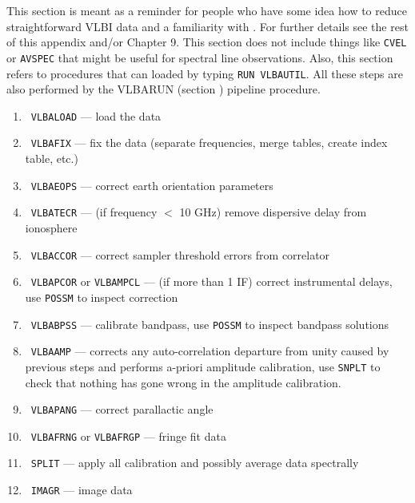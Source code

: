 %

This section is meant as a reminder for people who have some idea how
to reduce straightforward VLBI data and a familiarity with \AIPS\@.
For further details see the rest of this appendix and/or Chapter 9.
This section does not include things like {\tt CVEL} or {\tt AVSPEC}
that might be useful for spectral line observations.  Also, this section
refers to procedures that can loaded by typing {\tt RUN VLBAUTIL}.  All
these steps are also performed by the VLBARUN (section )
pipeline procedure.
\begin{enumerate}
\item\ {{\tt VLBALOAD} --- load the data}
\item\ {{\tt VLBAFIX} --- fix the data (separate frequencies, merge
         tables, create index table, etc.)}
\item\ {{\tt VLBAEOPS} --- correct earth orientation parameters}
\item\ {{\tt VLBATECR} --- (if frequency $<$ 10 GHz) remove dispersive
         delay from ionosphere}
\item\ {{\tt VLBACCOR} --- correct sampler threshold errors from
         correlator}
\item\ {{\tt VLBAPCOR} or {\tt VLBAMPCL} --- (if more than 1 IF)
         correct instrumental delays, use {\tt POSSM} to inspect
         correction}
\item\ {{\tt VLBABPSS} --- calibrate bandpass, use {\tt POSSM} to
         inspect bandpass solutions}
\item\ {{\tt VLBAAMP} --- corrects any auto-correlation departure from
         unity caused by previous steps and performs a-priori
         amplitude calibration, use {\tt SNPLT} to check that
         nothing has gone wrong in the amplitude calibration.}
\item\ {{\tt VLBAPANG} --- correct parallactic angle}
\item\ {{\tt VLBAFRNG} or {\tt VLBAFRGP} --- fringe fit data}
\item\ {{\tt SPLIT} --- apply all calibration and possibly average
        data spectrally}
\item\ {{\tt IMAGR} --- image data}
\end{enumerate}

